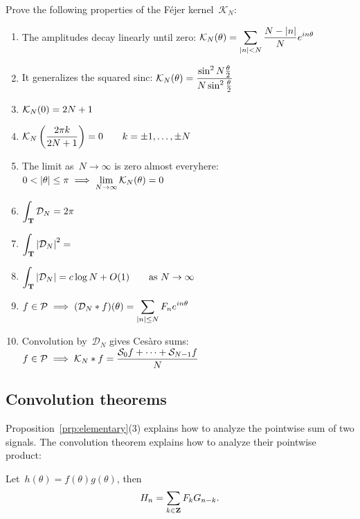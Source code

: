 \begin{exercice}
	Prove the following properties of the Féjer kernel~$\mathcal{K}_N$:
	\begin{enumerate}
		\item
			The amplitudes decay linearly until zero:
			$\displaystyle\mathcal{K}_N(\theta)=\sum_{|n|<N}\frac{N-|n|}{N}e^{in\theta}$
		\item
			It generalizes the squared sinc:
			$\displaystyle\mathcal{K}_N(\theta)=
			\frac{\sin^2N\frac\theta2}{N\sin^2\frac\theta2}$
		\item $\displaystyle\mathcal{K}_N(0)=2N+1$
		\item $\displaystyle\mathcal{K}_N\left(\frac{2\pi k}{2N+1}\right)=0
			\qquad k=\pm 1,\ldots,\pm N$
		\item
			The limit as~$N\to\infty$ is zero almost everyhere:
			$\ds 0<|\theta|\le\pi\implies\lim_{N\to\infty}\mathcal{K}_N(\theta)=0$
		\item $\displaystyle\int_{\mathbf{T}}\mathcal{D}_N = 2\pi$
		\item $\displaystyle\int_{\mathbf{T}}\left|\mathcal{D}_N\right|^2 =$
		\item $\displaystyle\int_{\mathbf{T}}\left|\mathcal{D}_N\right| =c\log N +
			O(1)\qquad\mathrm{as}\ N\to\infty$
		\item $\displaystyle f\in\mathcal{P}\implies (\mathcal{D}_N*f)(\theta) =
			\sum_{|n|\le N} F_ne^{in\theta}$
		\item
			Convolution by~$\mathcal{D}_N$ gives Cesàro sums:
			$\displaystyle f\in\mathcal{P}\implies \mathcal{K}_N*f =
			\frac{\mathcal{S}_0f+\cdots+\mathcal{S}_{N-1}f}{N}$
	\end{enumerate}
\end{exercice}

\subsection{Convolution theorems}

Proposition~\ref{prp:elementary}(3) explains how to analyze the pointwise sum
of two signals.  The convolution theorem explains how to analyze their
pointwise product:

\begin{proposition}
	Let~$h(\theta)=f(\theta)g(\theta)$, then
	\[
		\displaystyle H_n
		= \sum_{k\in\mathbf{Z}} F_kG_{n-k}.
		\]
\end{proposition}

